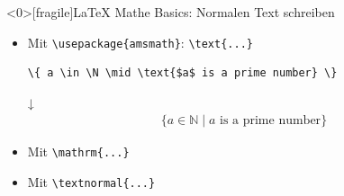 \documentclass[main.tex]{subfiles}
\begin{document}
\begin{frame}<0>[fragile]{\LaTeX{} Mathe Basics: Normalen Text schreiben}
    \begin{itemize}
        \item Mit \verb|\usepackage{amsmath}|: \verb|\text{...}|\medskip
        \begin{center}
            \begin{verbatim}
\{ a \in \N \mid \text{$a$ is a prime number} \}
            \end{verbatim}
            \vspace{-10pt}
            ↓
            \vspace{-5pt}
            \begin{align*}
                \{ a \in \mathbb{N} \mid \text{$a$ is a prime number} \}
            \end{align*}
        \end{center}
        \item Mit \verb|\mathrm{...}|
        \item Mit \verb|\textnormal{...}| 
    \end{itemize}
\end{frame}
\end{document}
